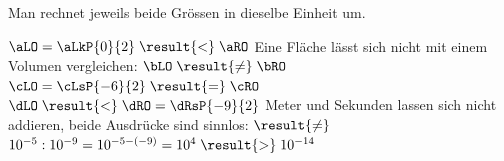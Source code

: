 Man rechnet jeweils beide Grössen in dieselbe Einheit um.
\begin{abcliste}
\abc $\aLO = \aLkP{0}{2} \;\result{<}\; \aRO$
\abc Eine Fläche lässt sich nicht mit einem Volumen vergleichen: $\bLO \;\result{\neq}\; \bRO$
\abc $\cLO = \cLsP{-6}{2} \;\result{=}\; \cRO$
\abc $\dLO \;\result{<}\; \dRO = \dRsP{-9}{2}$
\abc Meter und Sekunden lassen sich nicht addieren, beide Ausdrücke sind sinnlos: $\result{\neq}$
\abc $10^{-5} : 10^{-9} = 10^{-5-(-9)} = 10^{4} \;\result{>}\; 10^{-14}$
\end{abcliste}
